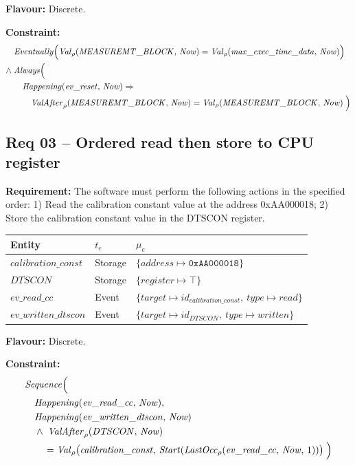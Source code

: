 \textbf{Flavour:} Discrete.

\textbf{Constraint:}
\begin{align*}
    &\mathit{Eventually}\Bigl(\mathit{Val}_\rho(\mathit{MEASUREMT\_BLOCK},\, \mathit{Now}) = \mathit{Val}_\rho(\mathit{max\_exec\_time\_data},\, \mathit{Now})\Bigr) \\
    \land\; &\mathit{Always}\Bigl( \\
    &\quad \mathit{Happening}(\mathit{ev\_reset},\, \mathit{Now}) \Rightarrow {} \\
    &\qquad \mathit{ValAfter}_\rho(\mathit{MEASUREMT\_BLOCK},\, \mathit{Now}) = \mathit{Val}_\rho(\mathit{MEASUREMT\_BLOCK},\, \mathit{Now})
    \;\Bigr)
\end{align*}

\subsection{Req 03 -- Ordered read then store to CPU register}

\textbf{Requirement:} The software must perform the following actions in the specified order:
1) Read the calibration constant value at the address 0xAA000018;
2) Store the calibration constant value in the DTSCON register.

\medskip

\begin{center}
\begin{tabular}{lll}
    \toprule
    \textbf{Entity} & $t_e$ & $\mu_e$ \\
    \midrule
    $\mathit{calibration\_const}$ & Storage & $\{\mathit{address} \mapsto \texttt{0xAA000018}\}$ \\
    $\mathit{DTSCON}$ & Storage & $\{\mathit{register} \mapsto \top\}$ \\
    $\mathit{ev\_read\_cc}$ & Event & $\{\mathit{target} \mapsto id_{\mathit{calibration\_const}},\ \mathit{type} \mapsto \mathit{read}\}$ \\
    $\mathit{ev\_written\_dtscon}$ & Event & $\{\mathit{target} \mapsto id_{\mathit{DTSCON}},\ \mathit{type} \mapsto \mathit{written}\}$ \\
    \bottomrule
\end{tabular}
\end{center}

\textbf{Flavour:} Discrete.

\textbf{Constraint:}
\begin{align*}
    &\mathit{Sequence}\Bigl( \\
    &\quad \mathit{Happening}(\mathit{ev\_read\_cc},\, \mathit{Now}), \\
    &\quad \mathit{Happening}(\mathit{ev\_written\_dtscon},\, \mathit{Now}) \\
    &\quad \land\; \mathit{ValAfter}_\rho(\mathit{DTSCON},\, \mathit{Now}) \\
    &\qquad = \mathit{Val}_\rho\bigl(\mathit{calibration\_const},\, \mathit{Start}(\mathit{LastOcc}_\rho(\mathit{ev\_read\_cc},\, \mathit{Now},\, 1))\bigr)
    \;\Bigr)
\end{align*}


